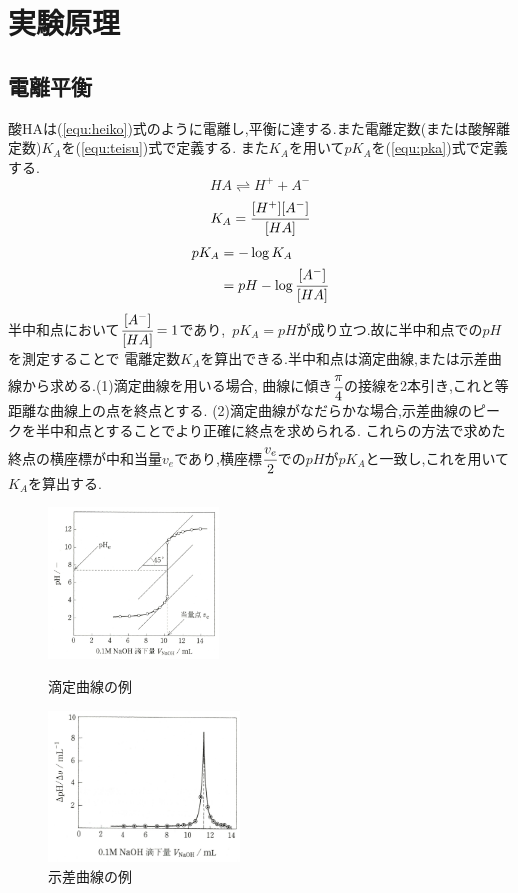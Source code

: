 \section{実験原理}
\subsection{電離平衡}
酸HAは(\ref{equ:heiko})式のように電離し,平衡に達する.また電離定数(または酸解離定数)$K_A$を(\ref{equ:teisu})式で定義する.
また$K_A$を用いて$pK_A$を(\ref{equ:pka})式で定義する.
\begin{equation}
  \label{equ:heiko}
  HA\rightleftharpoons H^+ + A^-
\end{equation}
\begin{equation}
  \label{equ:teisu}
  K_A=\cfrac{[H^+][A^-]}{[HA]}
\end{equation}
\begin{align}
  \label{equ:pka}
  \begin{aligned}
    pK_A&=-\log K_A\\
    &=pH-\log \cfrac{[A^-]}{[HA]}
  \end{aligned}
\end{align}
半中和点において$\cfrac{[A^-]}{[HA]}=1$であり,\ $pK_A=pH$が成り立つ.故に半中和点での$pH$を測定することで
電離定数$K_A$を算出できる.半中和点は滴定曲線,または示差曲線から求める.(1)滴定曲線を用いる場合,
曲線に傾き$\cfrac{\pi}{4}$の接線を2本引き,これと等距離な曲線上の点を終点とする.
(2)滴定曲線がなだらかな場合,示差曲線のピークを半中和点とすることでより正確に終点を求められる.
これらの方法で求めた終点の横座標が中和当量$v_e$であり,横座標$\cfrac{v_e}{2}$での$pH$が$pK_A$と一致し,これを用いて$K_A$を算出する.
\begin{figure}[htbp]
 \begin{minipage}{0.5\hsize}
  \begin{center}
   \includegraphics[height=40mm]{tekitei.png}
  \end{center}
  \caption{滴定曲線の例}
 \end{minipage}
 \begin{minipage}{0.5\hsize}
  \begin{center}
   \includegraphics[height=40mm]{sisa.png}
  \end{center}
  \caption{示差曲線の例}
 \end{minipage}
\end{figure}
